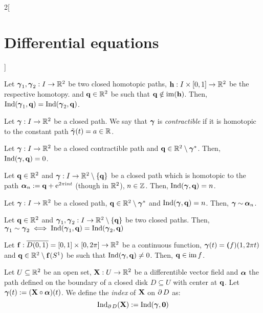 \documentclass[../../../main.tex]{subfiles}
\begin{document}
\begin{multicols}{2}[\section{Differential equations}]
\begin{proposition}
    Let $\vf\gamma_1,\vf\gamma_2:I\rightarrow\RR^2$ be two closed homotopic paths, $\vf{h}:I\times[0,1]\rightarrow\RR^2$ be the respective homotopy. and $\vf{q}\in\RR^2$ be such that $\vf{q}\notin \im(\vf{h})$. Then, $\Ind(\vf\gamma_1,\vf{q})=\Ind(\vf\gamma_2,\vf{q})$.
  \end{proposition}
  \begin{definition}
    Let $\vf\gamma:I\rightarrow\RR^2$ be a closed path. We say that $\vf\gamma$ is \emph{contractible} if it is homotopic to the constant path $\tilde{\vf\gamma}(t)=a\in\RR$.
  \end{definition}
  \begin{proposition}
    Let $\vf\gamma:I\rightarrow\RR^2$ be a closed contractible path and $\vf{q}\in\RR^2\setminus\vf\gamma^*$. Then, $\Ind(\vf\gamma,\vf{q})=0$.
  \end{proposition}
  \begin{proposition}
    Let $\vf{q}\in\RR^2$ and $\vf\gamma:I\rightarrow\RR^2\setminus\{\vf{q}\}$ be a closed path which is homotopic to the path $\vf\alpha_n:=\vf{q}+\exp{2\pi\ii n t}$ (though in $\RR^2$), $n\in\ZZ$. Then, $\Ind(\vf\gamma,\vf{q})=n$.
  \end{proposition}
  \begin{proposition}
    Let $\vf\gamma:I\rightarrow\RR^2$ be a closed path, $\vf{q}\in\RR^2\setminus\vf\gamma^*$ and $\Ind(\vf\gamma,\vf{q})=n$. Then, $\vf\gamma\homotop\vf\alpha_n$.
  \end{proposition}
  \begin{theorem}
    Let $\vf{q}\in\RR^2$ and $\vf\gamma_1,\vf\gamma_2:I\rightarrow\RR^2\setminus\{\vf{q}\}$ be two closed paths. Then, $\vf\gamma_1\sim\vf\gamma_2\iff\Ind(\vf\gamma_1,\vf{q})=\Ind(\vf\gamma_2,\vf{q})$
  \end{theorem}
  \begin{theorem}
    Let $\vf{f}:\overline{D(0,1)}=[0,1]\times[0,2\pi]\rightarrow\RR^2$ be a continuous function, $\vf\gamma(t)=\vf(f)(1,2\pi t)$ and $\vf{q}\in\RR^2\setminus \vf{f}(S^1)$ be such that $\Ind(\vf\gamma,\vf{q})\ne 0$. Then, $\vf{q}\in \im f$.
  \end{theorem}
  \begin{definition}
    Let $U\subseteq \RR^2$ be an open set, $\vf{X}:U\rightarrow\RR^2$ be a differentible vector field and $\vf\alpha$ the path defined on the boundary of a closed disk $D\subseteq U$ with center at $\vf{q}$. Let $\vf\gamma(t):=(\vf{X}\circ\vf\alpha)(t)$. We define the \emph{index} of $\vf{X}$ on $\Fr{D}$ as: $$\Ind_{\Fr{D}}(\vf{X}):=\Ind(\vf\gamma,\vf{0})$$

\end{definition}
\end{multicols}
\end{document}
